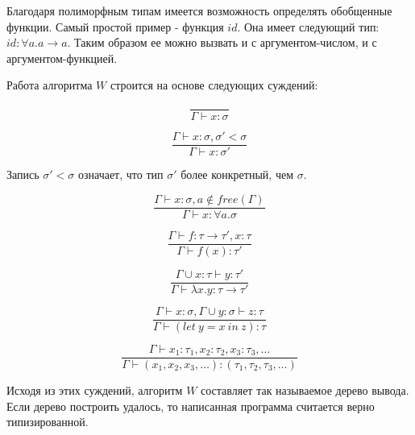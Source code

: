 Благодаря полиморфным типам имеется возможность определять обобщенные функции.
Самый простой пример - функция $id$.
Она имеет следующий тип: $id: \forall a. a \to a$.
Таким образом ее можно вызвать и с аргументом-числом, и с аргументом-функцией.

Работа алгоритма $W$ строится на основе следующих суждений:

\begin{equation}
    \label{eq:taut}
    \tag{TAUT}
    \frac{}{\Gamma \vdash x: \sigma}
\end{equation}

\begin{equation}
    \label{eq:inst}
    \tag{INST}
    \frac{\Gamma \vdash x: \sigma, \sigma' < \sigma}{\Gamma \vdash x: \sigma'}
\end{equation}

Запись $\sigma' < \sigma$ означает, что тип $\sigma'$ более конкретный, чем $\sigma$.

\begin{equation}
    \label{eq:gen}
    \tag{GEN}
    \frac{\Gamma \vdash x: \sigma, a \notin free(\Gamma)}{\Gamma \vdash x: \forall a. \sigma}
\end{equation}

\begin{equation}
    \label{eq:comb}
    \tag{COMB}
    \frac{\Gamma \vdash f: \tau \to \tau', x: \tau}{\Gamma \vdash f(x): \tau'}
\end{equation}

\begin{equation}
    \label{eq:abs}
    \tag{ABS}
    \frac{\Gamma \cup x: \tau \vdash y: \tau'}{\Gamma \vdash \lambda x. y : \tau \to \tau'}
\end{equation}

\begin{equation}
    \label{eq:let}
    \tag{LET}
    \frac{\Gamma \vdash x: \sigma, \Gamma \cup y: \sigma \vdash z: \tau}{\Gamma \vdash (let ~ y = x ~ in ~ z): \tau}
\end{equation}

\begin{equation}
    \label{eq:tuple}
    \tag{TUPLE}
    \frac{\Gamma \vdash x_1: \tau_1, x_2: \tau_2, x_3: \tau_3, \ldots}{\Gamma \vdash (x_1, x_2, x_3, \ldots): (\tau_1, \tau_2, \tau_3, \ldots)}
\end{equation}

Исходя из этих суждений, алгоритм $W$ составляет так называемое дерево вывода.
Если дерево построить удалось, то написанная программа считается верно типизированной.



